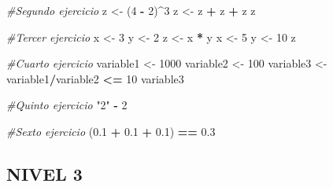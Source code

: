 \documentclass[
]{book}
\newenvironment{Shaded}{\begin{snugshade}}{\end{snugshade}}
\newcommand{\CommentTok}[1]{\textcolor[rgb]{0.56,0.35,0.01}{\textit{#1}}}
\newcommand{\DecValTok}[1]{\textcolor[rgb]{0.00,0.00,0.81}{#1}}
\newcommand{\FloatTok}[1]{\textcolor[rgb]{0.00,0.00,0.81}{#1}}
\newcommand{\NormalTok}[1]{#1}
\newcommand{\OperatorTok}[1]{\textcolor[rgb]{0.81,0.36,0.00}{\textbf{#1}}}
\newcommand{\StringTok}[1]{\textcolor[rgb]{0.31,0.60,0.02}{#1}}
\begin{document}
\begin{Shaded}
\begin{Highlighting}[]
\CommentTok{#Segundo ejercicio}
\NormalTok{z <-}\StringTok{ }\NormalTok{(}\DecValTok{4} \OperatorTok{-}\StringTok{ }\DecValTok{2}\NormalTok{)}\OperatorTok{^}\DecValTok{3}
\NormalTok{z <-}\StringTok{ }\NormalTok{z }\OperatorTok{+}\StringTok{ }\NormalTok{z }\OperatorTok{+}\StringTok{ }\NormalTok{z}
\NormalTok{z}
\end{Highlighting}
\end{Shaded}

\begin{Shaded}
\begin{Highlighting}[]
\CommentTok{#Tercer ejercicio}
\NormalTok{x <-}\StringTok{ }\DecValTok{3}
\NormalTok{y <-}\StringTok{ }\DecValTok{2}
\NormalTok{z <-}\StringTok{ }\NormalTok{x }\OperatorTok{*}\StringTok{ }\NormalTok{y}
\NormalTok{x <-}\StringTok{ }\DecValTok{5}
\NormalTok{y <-}\StringTok{ }\DecValTok{10}
\NormalTok{z}
\end{Highlighting}
\end{Shaded}

\begin{Shaded}
\begin{Highlighting}[]
\CommentTok{#Cuarto ejercicio}
\NormalTok{variable1 <-}\StringTok{ }\DecValTok{1000}
\NormalTok{variable2 <-}\StringTok{ }\DecValTok{100}
\NormalTok{variable3 <-}\StringTok{ }\NormalTok{variable1}\OperatorTok{/}\NormalTok{variable2 }\OperatorTok{<=}\StringTok{ }\DecValTok{10}
\NormalTok{variable3}
\end{Highlighting}
\end{Shaded}

\begin{Shaded}
\begin{Highlighting}[]
\CommentTok{#Quinto ejercicio}
\StringTok{"2"} \OperatorTok{-}\StringTok{ }\DecValTok{2}
\end{Highlighting}
\end{Shaded}

\begin{Shaded}
\begin{Highlighting}[]
\CommentTok{#Sexto ejercicio}
\NormalTok{(}\FloatTok{0.1} \OperatorTok{+}\StringTok{ }\FloatTok{0.1} \OperatorTok{+}\StringTok{ }\FloatTok{0.1}\NormalTok{) }\OperatorTok{==}\StringTok{ }\FloatTok{0.3}
\end{Highlighting}
\end{Shaded}

\hypertarget{nivel-3}{%
\subsection{NIVEL 3}\label{nivel-3}}
\end{document}
